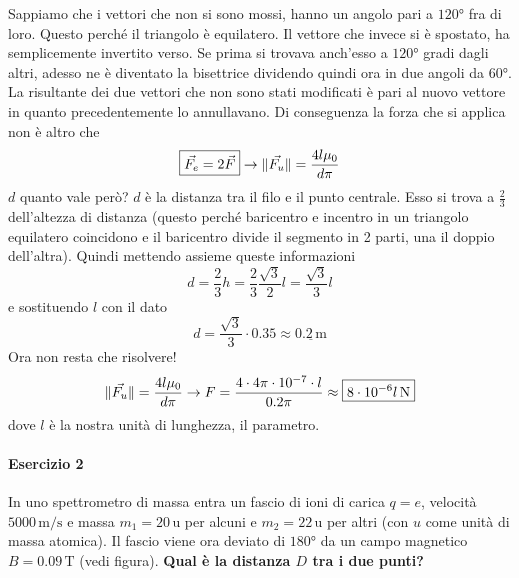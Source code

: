 Sappiamo che i vettori che non si sono mossi, hanno un angolo pari a $\ang{120}$ fra di loro. Questo
perché il triangolo è equilatero. Il vettore che invece si è spostato, ha semplicemente invertito
verso. Se prima si trovava anch'esso a $\ang{120}$ gradi dagli altri, adesso ne è diventato la 
bisettrice dividendo quindi ora in due angoli da $\ang{60}$. La risultante dei due vettori che non 
sono stati modificati è pari al nuovo vettore in quanto precedentemente lo annullavano.
Di conseguenza la forza che si applica non è altro che
\begin{equation*}
\boxed{\vec{F_e} = 2\vec{F}} \rightarrow \lVert\vec{F_u}\rVert = \frac{4l\mu_0}{d\pi}
\end{equation*}
$d$ quanto vale però? $d$ è la distanza tra il filo e il punto centrale. Esso si trova a $\frac{2}{3}$
dell'altezza di distanza (questo perché baricentro e incentro in un triangolo equilatero coincidono
e il baricentro divide il segmento in 2 parti, una il doppio dell'altra). Quindi mettendo assieme 
queste informazioni
\begin{equation*}
d=\frac{2}{3}h = \frac{2}{3}\frac{\sqrt{3}}{2}l = \frac{\sqrt{3}}{3}l 
\end{equation*}
e sostituendo $l$ con il dato
\begin{equation*}
d = \frac{\sqrt{3}}{3}\cdot0.35 \approx \underline{0.2\,\text{m}}
\end{equation*}
Ora non resta che risolvere!
\begin{equation*}
\lVert\vec{F_u}\rVert = \frac{4l\mu_0}{d\pi} \rightarrow F = \frac{4\cdot4\pi\cdot10^{-7}\cdot l}{0.2\pi}
\approx \boxed{8\cdot10^{-6}l\,\text{N}}
\end{equation*}
dove $l$ è la nostra unità di lunghezza, il parametro.

\paragraph{Esercizio 2}
In uno spettrometro di massa entra un fascio di ioni di carica $q=e$, velocità $5000\,\text{m/s}$ e
massa $m_1=20\,\text{u}$ per alcuni e $m_2=22\,\text{u}$ per altri (con $u$ come unità di massa 
atomica). Il fascio viene ora deviato di $\ang{180}$ da un campo magnetico $B=0.09\,\text{T}$ (vedi
figura). \textbf{Qual è la distanza $D$ tra i due punti?}

\begin{center}
\end{center}
\divisor

